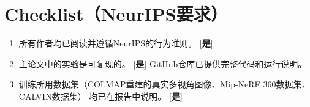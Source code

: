 \documentclass{article}
\begin{document}
\newpage
\section*{Checklist（NeurIPS要求）}

\begin{enumerate}
\item 所有作者均已阅读并遵循NeurIPS的行为准则。 [\textbf{是}]
\item 主论文中的实验是可复现的。 [\textbf{是}] GitHub仓库已提供完整代码和运行说明。
\item 训练所用数据集（COLMAP重建的真实多视角图像、Mip-NeRF 360数据集、CALVIN数据集）
      均已在报告中说明。 [\textbf{是}]
\end{enumerate}
\end{document}
